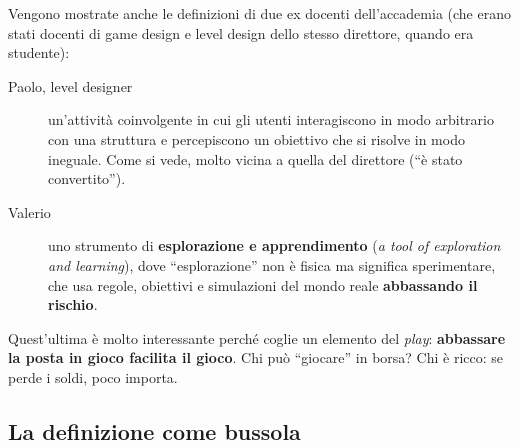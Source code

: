 Vengono mostrate anche le definizioni di due ex docenti dell'accademia (che
erano stati docenti di game design e level design dello stesso direttore,
quando era studente):
\begin{description}
  \item[Paolo, level designer] un'attività coinvolgente in cui gli utenti
        interagiscono in modo arbitrario con una struttura e percepiscono un
        obiettivo che si risolve in modo ineguale. Come si vede, molto vicina
        a quella del direttore (``è stato convertito'').
  \item[Valerio] uno strumento di \textbf{esplorazione e apprendimento}
        (\emph{a tool of exploration and learning}), dove ``esplorazione'' non
        è fisica ma significa sperimentare, che usa regole, obiettivi e
        simulazioni del mondo reale \textbf{abbassando il rischio}.
\end{description}
Quest'ultima è molto interessante perché coglie un elemento del \emph{play}:
\textbf{abbassare la posta in gioco facilita il gioco}. Chi può ``giocare''
in borsa? Chi è ricco: se perde i soldi, poco importa.

\subsection{La definizione come bussola}


